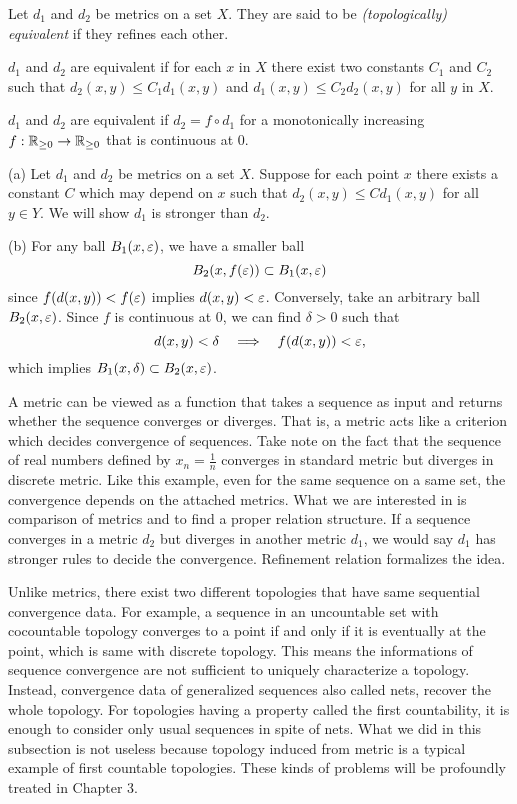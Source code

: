 \documentclass{../note}
\begin{document}
\begin{prb}
Let $d_1$ and $d_2$ be metrics on a set $X$.
They are said to be \emph{(topologically) equivalent} if they refines each other.
\begin{parts}
\item
$d_1$ and $d_2$ are equivalent if for each $x$ in $X$ there exist two constants $C_1$ and $C_2$ such that $d_2(x,y)\le C_1d_1(x,y)$ and $d_1(x,y)\le C_2d_2(x,y)$ for all $y$ in $X$.
\item
$d_1$ and $d_2$ are equivalent if $d_2=f\circ d_1$ for a monotonically increasing $f:\mathbb{R}_{\ge0}\to\mathbb{R}_{\ge0}$ that is continuous at $0$.
\end{parts}
\end{prb}
\begin{pf}
(a)
Let $d_1$ and $d_2$ be metrics on a set $X$.
Suppose for each point $x$ there exists a constant $C$ which may depend on $x$ such that $d_2(x,y)\le Cd_1(x,y)$ for all $y\in Y$.
We will show $d_1$ is stronger than $d_2$.

(b)
For any ball $B_1(x,\varepsilon)$, we have a smaller ball
\[B_2(x,f(\varepsilon))\subset B_1(x,\varepsilon)\]
since $f(d(x,y))<f(\varepsilon)$ implies $d(x,y)<\varepsilon$.
Conversely, take an arbitrary ball $B_2(x,\varepsilon)$.
Since $f$ is continuous at 0, we can find $\delta>0$ such that
\[d(x,y)<\delta\impl f(d(x,y))<\e,\]
which implies $B_1(x,\delta)\subset B_2(x,\varepsilon)$.
\end{pf}






A metric can be viewed as a function that takes a sequence as input and returns whether the sequence converges or diverges.
That is, a metric acts like a criterion which decides convergence of sequences.
Take note on the fact that the sequence of real numbers defined by $x_n=\frac1n$ converges in standard metric but diverges in discrete metric.
Like this example, even for the same sequence on a same set, the convergence depends on the attached metrics.
What we are interested in is comparison of metrics and to find a proper relation structure.
If a sequence converges in a metric $d_2$ but diverges in another metric $d_1$, we would say $d_1$ has stronger rules to decide the convergence.
Refinement relation formalizes the idea.

Unlike metrics, there exist two different topologies that have same sequential convergence data.
For example, a sequence in an uncountable set with cocountable topology converges to a point if and only if it is eventually at the point, which is same with discrete topology.
This means the informations of sequence convergence are not sufficient to uniquely characterize a topology.
Instead, convergence data of generalized sequences also called nets, recover the whole topology.
For topologies having a property called the first countability, it is enough to consider only usual sequences in spite of nets.
What we did in this subsection is not useless because topology induced from metric is a typical example of first countable topologies.
These kinds of problems will be profoundly treated in Chapter 3.
\end{document}

